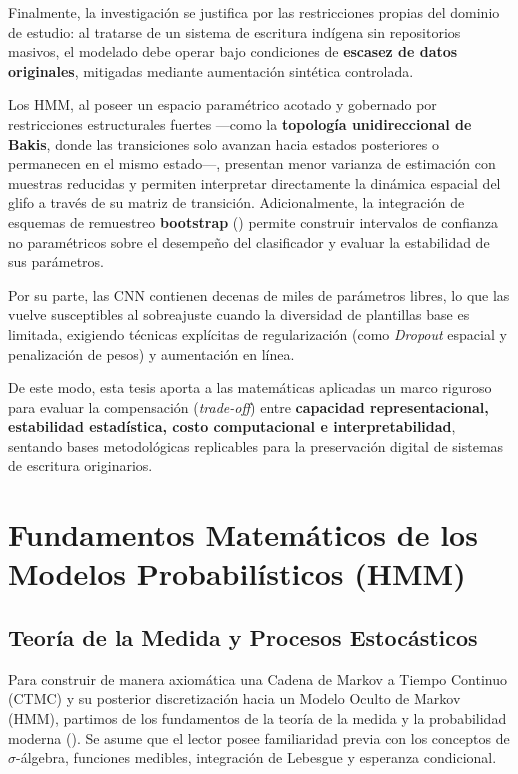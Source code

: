 \documentclass[
  spanish,
  us-letterpaper,
]{scrreprt}
\theoremstyle{definition}
\theoremstyle{remark}
\begin{document}
Finalmente, la investigación se justifica por las restricciones propias
del dominio de estudio: al tratarse de un sistema de escritura indígena
sin repositorios masivos, el modelado debe operar bajo condiciones de
\textbf{escasez de datos originales}, mitigadas mediante aumentación
sintética controlada.

Los HMM, al poseer un espacio paramétrico acotado y gobernado por
restricciones estructurales fuertes ---como la \textbf{topología
unidireccional de Bakis}, donde las transiciones solo avanzan hacia
estados posteriores o permanecen en el mismo estado---, presentan menor
varianza de estimación con muestras reducidas y permiten interpretar
directamente la dinámica espacial del glifo a través de su matriz de
transición. Adicionalmente, la integración de esquemas de remuestreo
\textbf{bootstrap} ()
permite construir intervalos de confianza no paramétricos sobre el
desempeño del clasificador y evaluar la estabilidad de sus parámetros.

Por su parte, las CNN contienen decenas de miles de parámetros libres,
lo que las vuelve susceptibles al sobreajuste cuando la diversidad de
plantillas base es limitada, exigiendo técnicas explícitas de
regularización (como \emph{Dropout} espacial y penalización de pesos) y
aumentación en línea.

De este modo, esta tesis aporta a las matemáticas aplicadas un marco
riguroso para evaluar la compensación (\emph{trade-off}) entre
\textbf{capacidad representacional, estabilidad estadística, costo
computacional e interpretabilidad}, sentando bases metodológicas
replicables para la preservación digital de sistemas de escritura
originarios.


\chapter{Fundamentos Matemáticos de los Modelos Probabilísticos
(HMM)}\label{fundamentos-matemuxe1ticos-de-los-modelos-probabiluxedsticos-hmm}

\section{Teoría de la Medida y Procesos
Estocásticos}\label{teoruxeda-de-la-medida-y-procesos-estocuxe1sticos}

Para construir de manera axiomática una Cadena de Markov a Tiempo
Continuo (CTMC) y su posterior discretización hacia un Modelo Oculto de
Markov (HMM), partimos de los fundamentos de la teoría de la medida y la
probabilidad moderna (). Se asume
que el lector posee familiaridad previa con los conceptos de
\(\sigma\)-álgebra, funciones medibles, integración de Lebesgue y
esperanza condicional.
\end{document}
